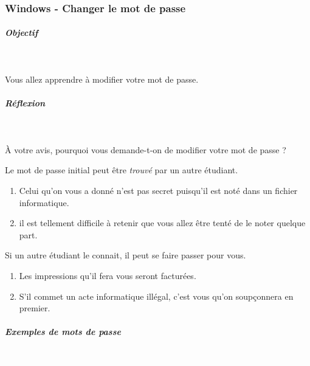 \documentclass[11pt,a4paper]{article}
\begin{document}
			
		\subsubsection{Windows - Changer le mot de passe} 
		\label{TD1TD1learningObject1.tex}
			
			
		\subparagraph{Objectif} 
		
					\textcolor{white}{.} \par
				
            \par
        
Vous allez apprendre \`a modifier votre mot de passe.

			
		\subparagraph{R\'eflexion} 
		
					\textcolor{white}{.} \par
				
            \par
        
\`A votre avis, pourquoi vous demande-t-on de modifier votre mot de passe ?

			\begin{boxedminipage}[h]{\linewidth}
		Le mot de passe initial peut \^etre  \textit{trouv\'e } par un autre \'etudiant.
					\begin{enumerate}
				
			\item Celui qu'on vous a donn\'e n'est pas secret puisqu'il est not\'e dans un fichier informatique.
			\item il est tellement difficile \`a retenir que vous allez \^etre tent\'e de le noter quelque part.
					\end{enumerate}
				
Si un autre \'etudiant le connait, il peut se faire passer pour vous.

					\begin{enumerate}
				
			\item Les impressions qu'il fera vous seront factur\'ees.
			\item S'il commet un acte informatique ill\'egal, c'est vous qu'on soup\c connera \textit{} en premier. 
					\end{enumerate}
				
			\end{boxedminipage}

			
		\subparagraph{Exemples de mots de passe} 
		
                \textcolor{white}{.} \par
            
\end{document}

